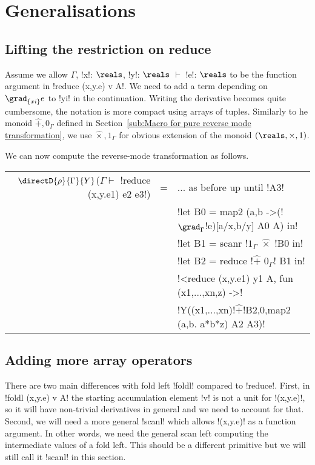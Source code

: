 \section{Generalisations}
\label{sec:generalisation}


\subsection{Lifting the restriction on reduce}
\label{sub:Lifting the restriction on reduce}

Assume we allow $\Gamma$, !x!: $\reals$, !y!: $\reals$ $\vdash$ !e!: $\reals$ to be the function argument in
!reduce (x,y.e) v A!. We need to add a term depending on $\grad_{\{xi\}}e$ to !yi! in the continuation.
Writing the derivative becomes quite cumbersome, the notation is more compact using arrays of tuples. 
Similarly to he monoid $\widehat{+},0_\Gamma$ defined in Section~\ref{sub:Macro for pure reverse mode transformation},
we use $\widehat{\times},1_\Gamma$ for obvious extension of the monoid $(\reals,\times,1)$.

We can now compute the reverse-mode transformation as follows.
\begin{center}
\begin{tabular}{r c l}
$\directD{\rho}{\Gamma}{Y}$($\Gamma\vdash $ !reduce (x,y.e1) e2 e3!) 
&=& ... as before up until !A3! \\
&& !let B0 = map2 (a,b ->(!$\grad_\Gamma$!e)[a/x,b/y] A0 A) in!\\
&& !let B1 = scanr !$1_\Gamma$ $\widehat{\times}$ !B0 in! \\
&& !let B2 = reduce !$\widehat{+}$ $0_\Gamma$! B1 in! \\
&& !<reduce (x,y.e1) y1 A, fun (x1,...,xn,z) ->! \\
&& !Y((x1,...,xn)!$\widehat{+}$!B2,0,map2 (a,b. a*b*z) A2 A3)!
\end{tabular}
\end{center}

\subsection{Adding more array operators}
\label{sub:Adding more array operators}

There are two main differences with fold left !foldl! compared to !reduce!. 
First, in !foldl (x,y.e) v A! the starting accumulation element !v! is not a unit for !(x,y.e)!,
so it will have non-trivial derivatives in general and we need to account for that.
Second, we will need a more general !scanl! which allows !(x,y.e)! as a function argument. 
In other words, we need the general scan left computing the intermediate values of a fold left.
This should be a different primitive but we will still call it !scanl! in this section.

